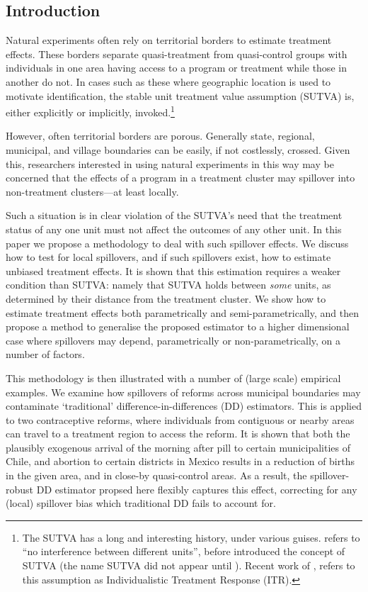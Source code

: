 \documentclass{article}
\begin{document}
\newpage
\begin{spacing}{1.1}
\section{Introduction}
Natural experiments often rely on territorial borders to estimate treatment 
effects.  These borders separate quasi-treatment from quasi-control groups with
individuals in one area having access to a program or treatment while those in 
another do not.  In cases such as these where geographic location is used to 
motivate identification, the stable unit treatment value assumption (SUTVA) is, 
either explicitly or implicitly, invoked.\footnote{The SUTVA has a long and 
interesting history, under various guises. \citet{Cox1958} refers to ``no 
interference between different units'', before \citet{Rubin1978} introduced the 
concept of SUTVA (the name SUTVA did not appear until \citet{Rubin1980}).  
Recent work of \citet{Manski2013}, refers to this assumption as Individualistic 
Treatment Response (ITR).}

However, often territorial borders are porous.  Generally state, regional,
municipal, and village boundaries can be easily, if not costlessly, crossed.
Given this, researchers interested in using natural experiments in this way may
be concerned that the effects of a program in a treatment cluster may spillover 
into non-treatment clusters---at least locally.

Such a situation is in clear violation of the SUTVA's need that the treatment
status of any one unit must not affect the outcomes of any other unit.  In this 
paper we propose a methodology to deal with such spillover effects.  We
discuss how to test for local spillovers, and if such spillovers exist, how to 
estimate unbiased treatment effects.  It is shown that this estimation requires
a weaker condition than SUTVA: namely that SUTVA holds between \emph{some} units, 
as determined by their distance from the treatment cluster.  We show how to 
estimate treatment effects both parametrically and semi-parametrically, and then
propose a method to generalise the proposed estimator to a higher dimensional 
case where spillovers may depend, parametrically or non-parametrically, on a number 
of factors.

This methodology is then illustrated with a number of (large scale) empirical 
examples.  We examine how spillovers of reforms across municipal boundaries may 
contaminate `traditional' difference-in-differences (DD) estimators.  This is 
applied to two contraceptive reforms, where individuals from contiguous or nearby 
areas can travel to a treatment region to access the reform.  It is shown that 
both the plausibly exogenous arrival of the morning after pill to certain 
municipalities of Chile, and abortion to certain districts in Mexico results in 
a reduction of births in the given area, and in close-by quasi-control areas.  
As a result, the spillover-robust DD estimator propsed here flexibly captures 
this effect, correcting for any (local) spillover bias which traditional DD
fails to account for.


\end{spacing}
\end{document}
